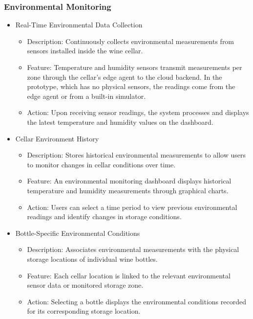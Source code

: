 \documentclass[conference]{IEEEtran}
\begin{document}
\subsubsection{Environmental Monitoring}
\begin{itemize}
    \item Real-Time Environmental Data Collection
    \begin{itemize}
        \item Description: Continuously collects environmental measurements from sensors installed inside the wine cellar.
        \item Feature: Temperature and humidity sensors transmit measurements per zone through the cellar's edge agent to the cloud backend. In the prototype, which has no physical sensors, the readings come from the edge agent or from a built-in simulator.
        \item Action: Upon receiving sensor readings, the system processes and displays the latest temperature and humidity values on the dashboard.
    \end{itemize}

    \item Cellar Environment History
    \begin{itemize}
        \item Description: Stores historical environmental measurements to allow users to monitor changes in cellar conditions over time.
        \item Feature: An environmental monitoring dashboard displays historical temperature and humidity measurements through graphical charts.
        \item Action: Users can select a time period to view previous environmental readings and identify changes in storage conditions.
    \end{itemize}

    \item Bottle-Specific Environmental Conditions
    \begin{itemize}
        \item Description: Associates environmental measurements with the physical storage locations of individual wine bottles.
        \item Feature: Each cellar location is linked to the relevant environmental sensor data or monitored storage zone.
        \item Action: Selecting a bottle displays the environmental conditions recorded for its corresponding storage location.
    \end{itemize}


\end{itemize}
\end{document}
